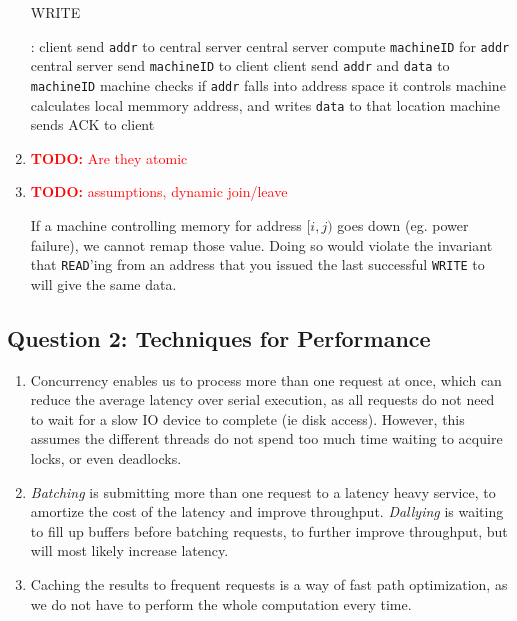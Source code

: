 \documentclass[11pt,a4paper,english]{article}
\newcommand{\todo}[1]{\textcolor{red}{\textbf{TODO: }#1}}
\begin{document}
\begin{enumerate}
\begin{algorithm}[H]
\caption{WRITE}
\begin{algorithmic}[1]
:
\State client send \texttt{addr} to central server
\State central server compute \texttt{machineID} for \texttt{addr}
\State central server send \texttt{machineID} to client
\smallskip
\State client send \texttt{addr} and \texttt{data} to \texttt{machineID}
\State machine checks if \texttt{addr} falls into address space it controls
\State machine calculates local memmory address, and writes \texttt{data} to that location
\State machine sends ACK to client
\EndProcedure
\end{algorithmic}
\end{algorithm}

\item \todo{Are they atomic}

\item \todo{assumptions, dynamic join/leave}

If a machine controlling memory for address $[i,j)$ goes down (eg. power failure),
we cannot remap those value. Doing so would violate the invariant that \texttt{READ}'ing
from an address that you issued the last successful \texttt{WRITE} to will give the same data.

\end{enumerate}


\subsection{Question 2: Techniques for Performance}

\begin{enumerate}
\item Concurrency enables us to process more than one request at once, which can
  reduce the average latency over serial execution, as all requests do not need
  to wait for a slow IO device to complete (ie disk access). However, this
  assumes the different threads do not spend too much time waiting to acquire
  locks, or even deadlocks.

\item \emph{Batching} is submitting more than one request to a latency heavy
  service, to amortize the cost of the latency and improve
  throughput. \emph{Dallying} is waiting to fill up buffers before batching
  requests, to further improve throughput, but will most likely increase
  latency.

\item Caching the results to frequent requests is a way of fast path
  optimization, as we do not have to perform the whole computation every time.
\end{enumerate}
\end{document}
